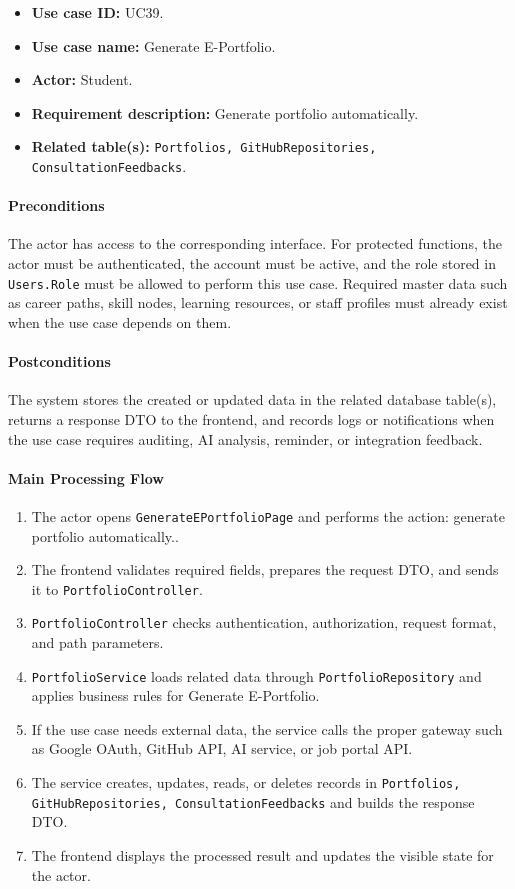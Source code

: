 \begin{itemize}
    \item \textbf{Use case ID:} UC39.
    \item \textbf{Use case name:} Generate E-Portfolio.
    \item \textbf{Actor:} Student.
    \item \textbf{Requirement description:} Generate portfolio automatically.
    \item \textbf{Related table(s):} \texttt{Portfolios, GitHubRepositories, ConsultationFeedbacks}.
\end{itemize}

\paragraph{Preconditions}

The actor has access to the corresponding interface. For protected functions, the actor must be authenticated, the account must be active, and the role stored in \texttt{Users.Role} must be allowed to perform this use case. Required master data such as career paths, skill nodes, learning resources, or staff profiles must already exist when the use case depends on them.

\paragraph{Postconditions}

The system stores the created or updated data in the related database table(s), returns a response DTO to the frontend, and records logs or notifications when the use case requires auditing, AI analysis, reminder, or integration feedback.

\paragraph{Main Processing Flow}

\begin{enumerate}
    \item The actor opens \texttt{GenerateEPortfolioPage} and performs the action: generate portfolio automatically..
    \item The frontend validates required fields, prepares the request DTO, and sends it to \texttt{PortfolioController}.
    \item \texttt{PortfolioController} checks authentication, authorization, request format, and path parameters.
    \item \texttt{PortfolioService} loads related data through \texttt{PortfolioRepository} and applies business rules for Generate E-Portfolio.
    \item If the use case needs external data, the service calls the proper gateway such as Google OAuth, GitHub API, AI service, or job portal API.
    \item The service creates, updates, reads, or deletes records in \texttt{Portfolios, GitHubRepositories, ConsultationFeedbacks} and builds the response DTO.
    \item The frontend displays the processed result and updates the visible state for the actor.
\end{enumerate}

